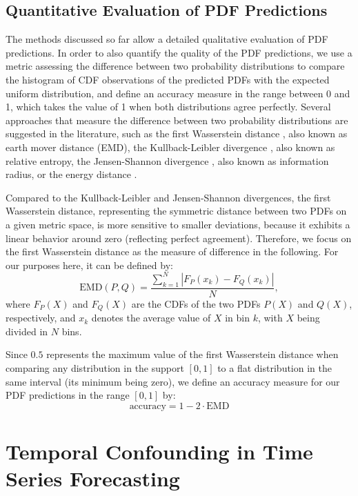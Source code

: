 \documentclass[BCOR=1mm, DIV=calc,10pt,
twoside=true,
twocolumn,
headings=normal]{scrartcl}
\begin{document}
\subsection{Quantitative Evaluation of PDF Predictions}
\label{sec:cdf_acc}

The methods discussed so far allow a detailed qualitative evaluation of PDF predictions. In order to also quantify the quality of the PDF predictions, we use a metric assessing the difference between two probability distributions to compare the histogram of CDF observations of the predicted PDFs with the expected uniform distribution, and define an accuracy measure in the range between 0 and 1, which takes the value of 1 when both distributions agree perfectly. Several approaches that measure the difference between two probability distributions are suggested in the literature, such as the first Wasserstein distance \cite{olkin1982}, also known as earth mover distance (EMD), the Kullback-Leibler divergence \cite{kullback1951}, also known as relative entropy, the Jensen-Shannon divergence \cite{dagan1997}, also known as information radius, or the energy distance \cite{SZEKELY20131249}.

Compared to the Kullback-Leibler and Jensen-Shannon divergences, the first Wasserstein distance, representing the symmetric distance between two PDFs on a given metric space, is more sensitive to smaller deviations, because it exhibits a linear behavior around zero (reflecting perfect agreement). Therefore, we focus on the first Wasserstein distance as the measure of difference in the following. For our purposes here, it can be defined by:
\begin{equation}
\text{EMD}(P, Q) = \frac{\sum_{k=1}^N |F_P(x_k) - F_Q(x_k)|}{N},
\end{equation}
where $F_P(X)$ and $F_Q(X)$ are the CDFs of the two PDFs $P(X)$ and $Q(X)$, respectively, and $x_k$ denotes the average value of $X$ in bin $k$, with $X$ being divided in $N$ bins.

Since $0.5$ represents the maximum value of the first Wasserstein distance when comparing any distribution in the support $[0, 1]$ to a flat distribution in the same interval (its minimum being zero), we define an accuracy measure for our PDF predictions in the range $[0, 1]$ by:
\begin{equation}
\text{accuracy} = 1 - 2 \cdot \text{EMD}
\end{equation}


\section{Temporal Confounding in Time Series Forecasting}
\label{sec:ts_confounding}
\end{document}
